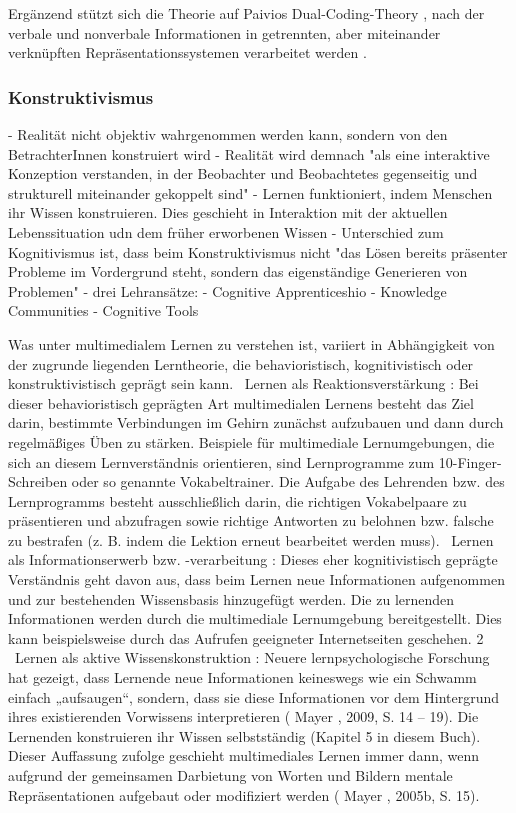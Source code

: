 Ergänzend stützt sich die Theorie auf Paivios Dual-Coding-Theory \parencite[S.~102f]{paivia_dual_2006}, nach der verbale und nonverbale Informationen in getrennten, aber miteinander verknüpften Repräsentationssystemen verarbeitet werden \parencite[S.~66f]{furstenau_lehr-lern-theorien_2019}.

\subsubsection{Konstruktivismus}

- Realität nicht objektiv wahrgenommen werden kann, sondern von den BetrachterInnen konstruiert wird
- Realität wird demnach "als eine interaktive Konzeption verstanden, in der Beobachter und Beobachtetes gegenseitig und strukturell miteinander gekoppelt sind"
- Lernen funktioniert, indem Menschen ihr Wissen konstruieren. Dies geschieht in Interaktion mit der aktuellen Lebenssituation udn dem früher erworbenen Wissen
- Unterschied zum Kognitivismus ist, dass beim Konstruktivismus nicht "das Lösen bereits präsenter Probleme im Vordergrund steht, sondern das eigenständige Generieren von Problemen"
- drei Lehransätze:
    - Cognitive Apprenticeshio
	- Knowledge Communities
	- Cognitive Tools



Was unter multimedialem Lernen zu verstehen ist, variiert in Abhängigkeit von der zugrunde liegenden Lerntheorie, die behavioristisch, kognitivistisch oder konstruktivistisch geprägt sein kann. \ Lernen als Reaktionsverstärkung : Bei dieser behavioristisch geprägten Art multimedialen Lernens besteht das Ziel darin, bestimmte Verbindungen im Gehirn zunächst aufzubauen und dann durch regelmäßiges Üben zu stärken. Beispiele für multimediale Lernumgebungen, die sich an diesem Lernverständnis orientieren, sind Lernprogramme zum 10-Finger-Schreiben oder so genannte Vokabeltrainer. Die Aufgabe des Lehrenden bzw. des Lernprogramms besteht ausschließlich darin, die richtigen Vokabelpaare zu präsentieren und abzufragen sowie richtige Antworten zu belohnen bzw. falsche zu bestrafen (z. B. indem die Lektion erneut bearbeitet werden muss). \ Lernen als Informationserwerb bzw. -verarbeitung : Dieses eher kognitivistisch geprägte Verständnis geht davon aus, dass beim Lernen neue Informationen aufgenommen und zur bestehenden Wissensbasis hinzugefügt werden. Die zu lernenden Informationen werden durch die multimediale Lernumgebung bereitgestellt. Dies kann beispielsweise durch das Aufrufen geeigneter Internetseiten geschehen. 2 \ Lernen als aktive Wissenskonstruktion : Neuere lernpsychologische Forschung hat gezeigt, dass Lernende neue Informationen keineswegs wie ein Schwamm einfach „aufsaugen“, sondern, dass sie diese Informationen vor dem Hintergrund ihres existierenden Vorwissens interpretieren ( Mayer , 2009, S. 14 – 19). Die Lernenden konstruieren ihr Wissen selbstständig (Kapitel 5 in diesem Buch). Dieser Auffassung zufolge geschieht multimediales Lernen immer dann, wenn aufgrund der gemeinsamen Darbietung von Worten und Bildern mentale Repräsentationen aufgebaut oder modifiziert werden ( Mayer , 2005b, S. 15).
